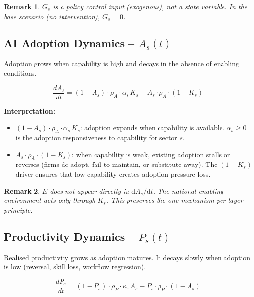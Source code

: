 \documentclass[11pt,a4paper]{article}
\newtheorem{remark}{Remark}
\begin{document}
\begin{remark}
$G_s$ is a policy control input (exogenous), not a state variable. In the base scenario (no intervention), $G_s = 0$.
\end{remark}

\subsection{AI Adoption Dynamics -- \texorpdfstring{$A_s(t)$}{As(t)}}

Adoption grows when capability is high and decays in the absence of enabling conditions.

\begin{equation}
\boxed{
\frac{dA_s}{dt}
= (1 - A_s)\cdot\rho_A\cdot\alpha_s\, K_s
- A_s\cdot\rho_A\cdot(1 - K_s)
}
\label{eq:As}
\end{equation}

\textbf{Interpretation:}
\begin{itemize}
  \item $(1 - A_s)\cdot\rho_A\cdot\alpha_s\, K_s$: adoption expands when capability is available. $\alpha_s \geq 0$ is the adoption responsiveness to capability for sector $s$.
  \item $A_s\cdot\rho_A\cdot(1 - K_s)$: when capability is weak, existing adoption stalls or reverses (firms de-adopt, fail to maintain, or substitute away). The $(1 - K_s)$ driver ensures that low capability creates adoption pressure loss.
\end{itemize}

\begin{remark}
$E$ does not appear directly in $\mathrm{d}A_s/\mathrm{d}t$. The national enabling environment acts \emph{only through} $K_s$. This preserves the one-mechanism-per-layer principle.
\end{remark}

\subsection{Productivity Dynamics -- \texorpdfstring{$P_s(t)$}{Ps(t)}}

Realised productivity grows as adoption matures. It decays slowly when adoption is low (reversal, skill loss, workflow regression).

\begin{equation}
\boxed{
\frac{dP_s}{dt}
= (1 - P_s)\cdot\rho_P\cdot\kappa_s\, A_s
- P_s\cdot\rho_P\cdot(1 - A_s)
}
\label{eq:Ps}
\end{equation}
\end{document}
